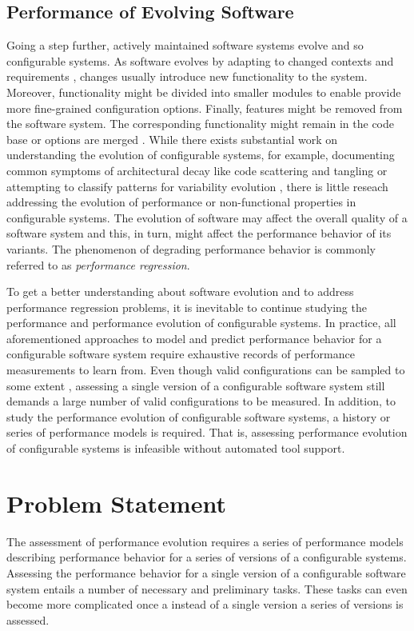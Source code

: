 \subsection{Performance of Evolving Software}

Going a step further, actively maintained software systems evolve and so
configurable systems. As software evolves by adapting to changed
contexts and requirements \citep{peng_analyzing_2011}, changes usually
introduce new functionality to the system. Moreover, functionality might be
divided into smaller modules to enable provide more fine-grained configuration
options. Finally, features might be removed from the software system. The
corresponding functionality might remain in the code base or options are merged
\citep{apel_feature-oriented_2013}.  While there
exists substantial work on understanding the evolution of configurable systems,
for example, documenting common symptoms of architectural decay
like code scattering and tangling \citep{passos_feature_2015,zhang_variability_2013} or attempting to
classify patterns for variability evolution
\citep{seidl_co-evolution_2012,peng_analyzing_2011,passos_towards_2012}, there
is little reseach addressing the evolution of performance or non-functional
properties in configurable systems. The evolution of software may affect the
overall quality of a software system and this, in turn, might affect the
performance behavior of its variants. The phenomenon of degrading performance
behavior is commonly referred to as \emph{performance regression}.

To get a better understanding about software evolution and to address
performance regression problems, it is inevitable to continue
studying the performance and performance evolution of configurable systems. In practice, all
aforementioned approaches to model and predict performance behavior for a
configurable software system require exhaustive records of performance
measurements to learn from. Even though valid configurations can be sampled to
some extent \citep{apel_feature-oriented_2013,siegmund_performance-influence_2015}, assessing a single version
of a configurable software system still demands a large number of valid configurations to be measured. In
addition, to study the performance evolution of configurable software systems,
a history or series of performance models is required. That is, assessing
performance evolution of configurable systems is infeasible without
automated tool support.

\section{Problem Statement}
The assessment of performance evolution requires a series of performance models
describing performance behavior for a series of versions of a configurable
systems. Assessing the performance behavior for a single version of a
configurable software system entails a number of necessary and preliminary
tasks. These tasks can even become more complicated once a instead of a single
version a series of versions is assessed.

